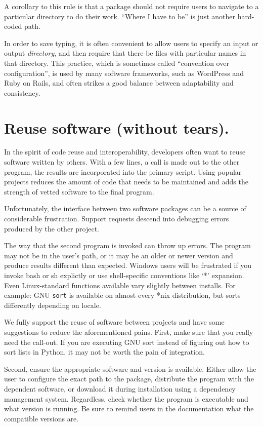 \documentclass[10pt]{article}
\begin{document}
A corollary to this rule is that a package should not require users to
navigate to a particular directory to do their work. ``Where I have to
be'' is just another hard-coded path.

In order to save typing, it is often convenient to allow users to
specify an input or output \emph{directory}, and then require that there
be files with particular names in that directory. This practice, which
is sometimes called ``convention over configuration'', is used by many
software frameworks, such as WordPress and Ruby on Rails, and often
strikes a good balance between adaptability and consistency.

\section{Reuse software (without tears).}

In the spirit of code reuse and interoperability, developers often want
to reuse software written by others. 
With a few lines, a call
is made out to the other program, the results are incorporated into the
primary script. Using popular projects reduces the amount of code that
needs to be maintained and adds the strength of vetted software to the
final program.

Unfortunately, the interface between two software packages can be a
source of considerable frustration. Support requests descend into
debugging errors produced by the other project.

The way that the second program is invoked can throw up errors.
The program may not be in the user's path, or it may be an
older or newer version and produce results different than expected.
Windows users will be frustrated if you invoke bash or sh explictly or
use shell-specific conventions like `*' expansion.
Even Linux-standard functions available vary slightly between
installs. For example: GNU \texttt{sort} is available on almost every
*nix distribution, but sorts differently depending on locale.

We fully support the reuse of software between projects and have some
suggestions to reduce the aforementioned pains. First, 
make sure that you really need the call-out. If you are
executing GNU sort instead of figuring out how to sort lists in Python,
it may not be worth the pain of integration.


Second, ensure the
appropriate software and version is available. Either allow the user to
configure the exact path to the package, distribute the program with the
dependent software, or download it during installation using a
dependency management system. Regardless, check whether the program is
executable and what version is running. Be sure to remind users in the
documentation what the compatible versions are.
\end{document}
